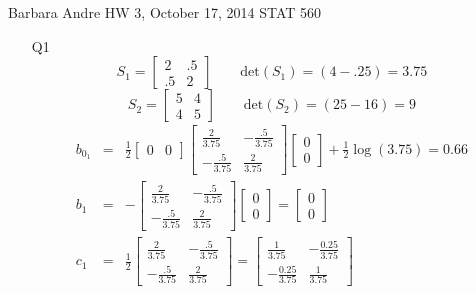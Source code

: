\documentclass{article}
\begin{document}
Barbara Andre
HW 3, October 17, 2014
STAT 560
\begin{itemize}
\item[Q1]
\begin{equation*}
S_1 = \begin{bmatrix}
2 & .5 \\
.5 & 2 
\end{bmatrix} \qquad\text{det}(S_1) = (4 - .25) = 3.75
\end{equation*}
\begin{equation*}
S_2 = \begin{bmatrix}
5 & 4 \\
4 & 5 
\end{bmatrix} \qquad \text{det}(S_2) = (25 - 16) = 9
\end{equation*}
\begin{eqnarray*}
b_{0_1} & =  & \frac{1}{2} \begin{bmatrix}
0 & 0
\end{bmatrix} \begin{bmatrix}
\frac{2}{3.75} & -\frac{.5}{3.75} \\
-\frac{.5}{3.75} & \frac{2}{3.75}
\end{bmatrix}
\begin{bmatrix}
0 \\
0
\end{bmatrix} + \frac{1}{2} \log(3.75) = 0.66 \\
b_1 &  =  & -\begin{bmatrix}
\frac{2}{3.75} & -\frac{.5}{3.75} \\
-\frac{.5}{3.75} & \frac{2}{3.75}
\end{bmatrix} \begin{bmatrix}
0 \\ 0
\end{bmatrix} = \begin{bmatrix}
0 \\ 0
\end{bmatrix}\\
c_1 & = & \frac{1}{2} \begin{bmatrix}
\frac{2}{3.75} & -\frac{.5}{3.75} \\
-\frac{.5}{3.75} & \frac{2}{3.75}
\end{bmatrix}  = 
\begin{bmatrix}
\frac{1}{3.75} & -\frac{0.25}{3.75} \\
-\frac{0.25}{3.75} & \frac{1}{3.75}
\end{bmatrix}
\end{eqnarray*}
\begin{eqnarray*}

\end{eqnarray*}
\end{itemize}
\end{document}
